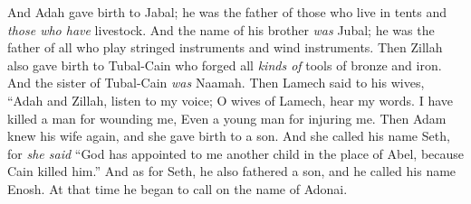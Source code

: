\begin{biblechapter}
\verse And Adah gave birth to Jabal; he was the father of those who live in tents and \textit{those who have} livestock.
\verse And the name of his brother \textit{was} Jubal; he was the father of all who play stringed instruments and wind instruments.
\verse Then Zillah also gave birth to Tubal-Cain who forged all \textit{kinds of} tools of bronze and iron. And the sister of Tubal-Cain \textit{was} Naamah.
\verse Then Lamech said to his wives,
\verse “Adah and Zillah, listen to my voice; 
O wives of Lamech, hear my words. 
I have killed a man for wounding me, 
Even a young man for injuring me.
\verse Then Adam knew his wife again, and she gave birth to a son. And she called his name Seth, for \textit{she said} “God has appointed to me another child in the place of Abel, because Cain killed him.”
\verse And as for Seth, he also fathered a son, and he called his name Enosh. At that time he began to call on the name of Adonai.
\end{biblechapter}

